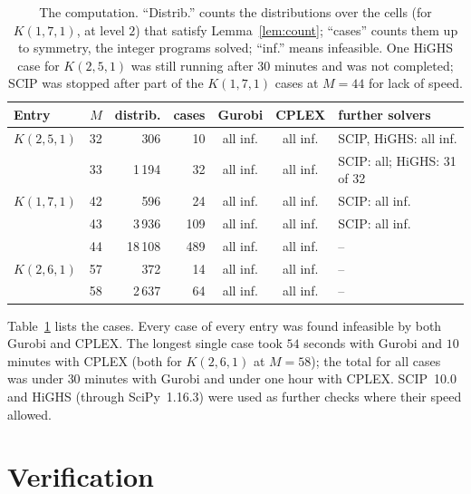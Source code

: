 \documentclass[11pt]{article}
\theoremstyle{remark}
\begin{document}
\begin{table}[h]
\centering
\small
\begin{tabular}{lrrrccl}
\toprule
Entry & $M$ & distrib. & cases & Gurobi & CPLEX & further solvers \\
\midrule
$K(2,5,1)$ & 32 & 306     & 10  & all inf. & all inf. & SCIP, HiGHS: all inf. \\
           & 33 & 1\,194  & 32  & all inf. & all inf. & SCIP: all; HiGHS: 31 of 32 \\
\midrule
$K(1,7,1)$ & 42 & 596     & 24  & all inf. & all inf. & SCIP: all inf. \\
           & 43 & 3\,936  & 109 & all inf. & all inf. & SCIP: all inf. \\
           & 44 & 18\,108 & 489 & all inf. & all inf. & -- \\
\midrule
$K(2,6,1)$ & 57 & 372     & 14  & all inf. & all inf. & -- \\
           & 58 & 2\,637  & 64  & all inf. & all inf. & -- \\
\bottomrule
\end{tabular}
\caption{The computation. ``Distrib.'' counts the distributions over the cells (for
$K(1,7,1)$, at level $2$) that satisfy Lemma~\ref{lem:count}; ``cases'' counts them up to
symmetry, the integer programs solved; ``inf.'' means infeasible. One HiGHS case for $K(2,5,1)$ was still running after 30 minutes and was not
completed; SCIP was stopped after part of the $K(1,7,1)$ cases at $M=44$ for lack of speed.}
\label{tab:computation}
\end{table}

Table~\ref{tab:computation} lists the cases. Every case of every entry was found infeasible by
both Gurobi and CPLEX. The longest single case took $54$ seconds with Gurobi and $10$ minutes with
CPLEX (both for $K(2,6,1)$ at $M=58$); the total for all cases was under $30$ minutes with Gurobi
and under one hour with CPLEX. SCIP~10.0 and HiGHS (through SciPy~1.16.3) were used as further
checks where their speed allowed.

\section{Verification}
\end{document}
